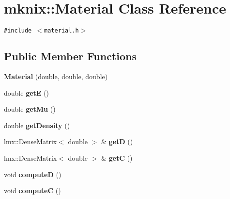 \hypertarget{classmknix_1_1Material}{
\section{mknix::Material Class Reference}
\label{classmknix_1_1Material}
}
{\tt \#include $<$material.h$>$}

\subsection*{Public Member Functions}
\begin{CompactItemize}
\item 
\hypertarget{classmknix_1_1Material_1f5cfec4e49a4dbfba8ccd2d2b3ac6c9}{
\textbf{Material} (double, double, double)}
\label{classmknix_1_1Material_1f5cfec4e49a4dbfba8ccd2d2b3ac6c9}

\item 
\hypertarget{classmknix_1_1Material_5e0f78fc32bea9435b20f6583de1c1e6}{
double \textbf{getE} ()}
\label{classmknix_1_1Material_5e0f78fc32bea9435b20f6583de1c1e6}

\item 
\hypertarget{classmknix_1_1Material_e9162080889d12bd5f8759b4efce2e1e}{
double \textbf{getMu} ()}
\label{classmknix_1_1Material_e9162080889d12bd5f8759b4efce2e1e}

\item 
\hypertarget{classmknix_1_1Material_65d3c9fb96d96ba179c9e4c3c68b814b}{
double \textbf{getDensity} ()}
\label{classmknix_1_1Material_65d3c9fb96d96ba179c9e4c3c68b814b}

\item 
\hypertarget{classmknix_1_1Material_043208ee829f606a01ca631ed14afaf3}{
lmx::DenseMatrix$<$ double $>$ \& \textbf{getD} ()}
\label{classmknix_1_1Material_043208ee829f606a01ca631ed14afaf3}

\item 
\hypertarget{classmknix_1_1Material_7005a08df113237a9cb6d36959bb9d25}{
lmx::DenseMatrix$<$ double $>$ \& \textbf{getC} ()}
\label{classmknix_1_1Material_7005a08df113237a9cb6d36959bb9d25}

\item 
\hypertarget{classmknix_1_1Material_134d81df672beb86b49b23dc0ac8cfe7}{
void \textbf{computeD} ()}
\label{classmknix_1_1Material_134d81df672beb86b49b23dc0ac8cfe7}

\item 
\hypertarget{classmknix_1_1Material_30503f7c95cd5f7410836224b9e66c19}{
void \textbf{computeC} ()}
\label{classmknix_1_1Material_30503f7c95cd5f7410836224b9e66c19}


\end{CompactItemize}
